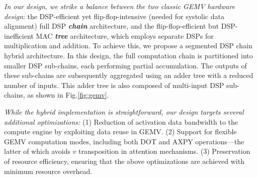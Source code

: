 \documentclass[conference]{IEEEtran}
\begin{document}
\textit{In our design, we strike a balance between the two classic GEMV hardware design}: the DSP-efficient yet flip-flop-intensive (needed for systolic data alignment) full DSP \textbf{\textit{chain}} architecture, and the flip-flop-efficient but DSP-inefficient MAC \textbf{\textit{tree}} architecture, which employs separate DSPs for multiplication and addition.
To achieve this, we propose a segmented DSP chain hybrid architecture. In this design, the full computation chain is partitioned into smaller DSP sub-chains, each performing partial accumulation. The outputs of these sub-chains are subsequently aggregated using an adder tree with a reduced number of inputs. This adder tree is also composed of multi-input DSP sub-chains, as shown in Fig.\ref{fig:gemv}.

\textit{While the hybrid implementation is straightforward, our design targets several additional optimizations:}
(1) Reduction of activation data bandwidth to the compute engine by exploiting data reuse in GEMV.
(2) Support for flexible GEMV computation modes, including both DOT and AXPY operations—the latter of which avoids $v$ transposition in attention mechanisms.
(3) Preservation of resource efficiency, ensuring that the above optimizations are achieved with minimum resource overhead.


\end{document}
